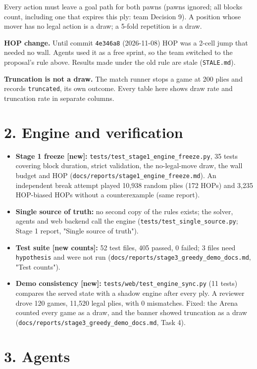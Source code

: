 \documentclass[11pt]{article}
\begin{document}
Every action must leave a goal path for both pawns (pawns ignored; all blocks count, including
one that expires this ply: team Decision 9). A position whose mover has no legal action is a
draw; a 5-fold repetition is a draw.

\textbf{HOP change.} Until commit \texttt{4e346a8} (2026-11-08) HOP was a 2-cell jump that needed no wall.
Agents used it as a free sprint, so the team switched to the proposal's rule above. Results made
under the old rule are stale (\texttt{STALE.md}).

\textbf{Truncation is not a draw.} The match runner stops a game at 200 plies and records
\texttt{truncated}, its own outcome. Every table here shows draw rate and truncation rate in separate
columns.

\section{2. Engine and verification}

\begin{itemize}
\item \textbf{Stage 1 freeze [new]:} \texttt{tests/test\_stage1\_engine\_freeze.py}, 35 tests covering block
duration, strict validation, the no-legal-move draw, the wall budget and HOP
(\texttt{docs/reports/stage1\_engine\_freeze.md}). An independent break attempt played 10,938 random
plies (172 HOPs) and 3,235 HOP-biased HOPs without a counterexample (same report).
\item \textbf{Single source of truth:} no second copy of the rules exists; the solver, agents and web
backend call the engine (\texttt{tests/test\_single\_source.py}; Stage 1 report, "Single source of truth").
\item \textbf{Test suite [new counts]:} 52 test files, 405 passed, 0 failed; 3 files need \texttt{hypothesis}
and were not run (\texttt{docs/reports/stage3\_greedy\_demo\_docs.md}, "Test counts").
\item \textbf{Demo consistency [new]:} \texttt{tests/web/test\_engine\_sync.py} (11 tests) compares the served
state with a shadow engine after every ply. A reviewer drove 120 games, 11,520 legal plies,
with 0 mismatches. Fixed: the Arena counted every game as a draw, and the banner showed
truncation as a draw (\texttt{docs/reports/stage3\_greedy\_demo\_docs.md}, Task 4).
\end{itemize}

\section{3. Agents}
\end{document}
